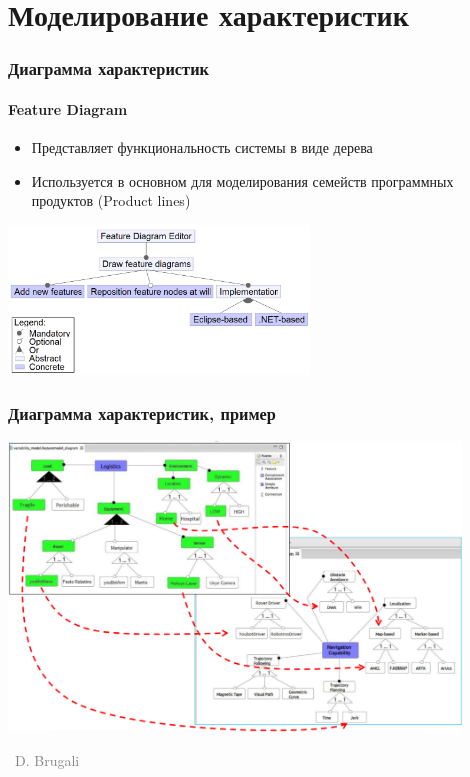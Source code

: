 \documentclass[xetex,mathserif,serif]{beamer}
\newcommand{\attribution}[1] {
	\vspace{-5mm}\begin{flushright}\begin{scriptsize}\textcolor{gray}{\textcopyright\, #1}\end{scriptsize}\end{flushright}
}
\begin{document}
	\section{Моделирование характеристик}

	\begin{frame}
		\frametitle{Диаграмма характеристик}
		\framesubtitle{Feature Diagram}
		\begin{itemize}
			\item Представляет функциональность системы в виде дерева
			\item Используется в основном для моделирования семейств программных продуктов (Product lines)
		\end{itemize}
		\begin{center}
			\includegraphics[width=0.6\textwidth]{featureDiagram.png}
		\end{center}
	\end{frame}

	\begin{frame}
		\frametitle{Диаграмма характеристик, пример}
		\begin{center}
			\includegraphics[width=0.9\textwidth]{featureDiagramExample.png}
			\attribution{D. Brugali}
		\end{center}
	\end{frame}
\end{document}
